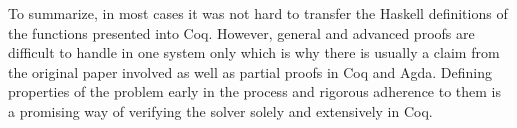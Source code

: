 \documentclass[a4paper,11pt]{article}
\begin{document}
To summarize, in most cases it was not hard to transfer the Haskell definitions of the functions presented into Coq. However, general and advanced proofs are difficult to handle in one system only which is why there is usually a claim from the original paper involved as well as partial proofs in Coq and Agda. Defining properties of the problem early in the process and rigorous adherence to them is a promising way of verifying the solver solely and extensively in Coq.
\end{document}
